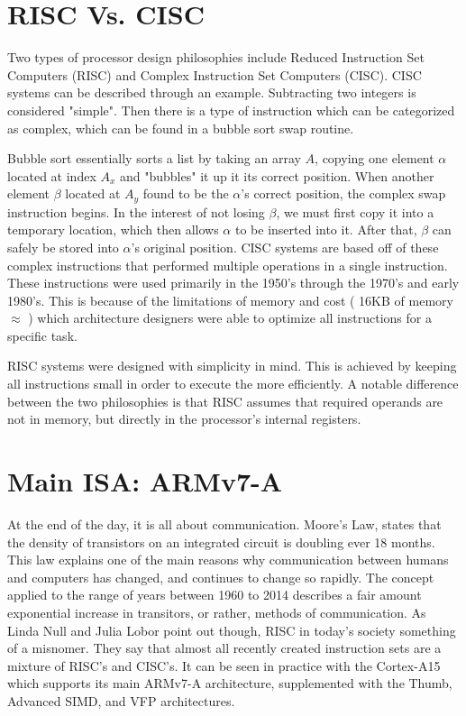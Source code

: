 \documentclass[12pt]{scrreprt}
\begin{document}
	\section{RISC Vs. CISC}

	Two types of processor design philosophies include Reduced Instruction Set Computers (RISC) and Complex Instruction Set Computers (CISC).
	CISC systems can be described through an example.
	Subtracting two integers is considered "simple".
	Then there is a type of instruction which can be categorized as complex, which can be found in a bubble sort swap routine.

	
		Bubble sort essentially sorts a list by taking an array $ A $, copying one element $ \alpha $ located at index $ A_{x} $ and "bubbles" it up it its correct position.
	When another element $\beta$ located at $ A_{y} $ found to be the $ \alpha $'s correct position, the complex swap instruction begins.
	In the interest of not losing $\beta$, we must first copy it into a temporary location, which then allows $\alpha$ to be inserted into it.
	After that, $\beta$ can safely be stored into $\alpha$'s original position.
	CISC systems are based off of these complex instructions that performed multiple operations in a single instruction.
	These instructions were used primarily in the 1950's through the 1970's and early 1980's.
	This is because of the limitations of memory and cost ( 16KB of memory $\approx$  ) which architecture designers were able to optimize all instructions for a specific task.

	RISC systems were designed with simplicity in mind.
	This is achieved by keeping all instructions small in order to execute the more efficiently.
	A notable difference between the two philosophies is that RISC assumes that required operands are not in memory, but directly in the processor's internal registers.

	\section{Main ISA: ARMv7-A}

	At the end of the day, it is all about communication. 
	Moore's Law, states that the density of transistors on an integrated circuit is doubling ever 18 months.
	This law explains one of the main reasons why communication between humans and computers has changed, and continues to change so rapidly.
	The concept applied to the range of years between 1960 to 2014 describes a fair amount exponential increase in transitors, or rather, methods of communication.
	As Linda Null and Julia Lobor point out though, RISC in today's society something of a misnomer.
	They say that almost all recently created instruction sets are a mixture of RISC's and CISC's.
	It can be seen in practice with the Cortex-A15 which supports its main ARMv7-A architecture, supplemented with the Thumb, Advanced SIMD, and VFP architectures.
\end{document}
